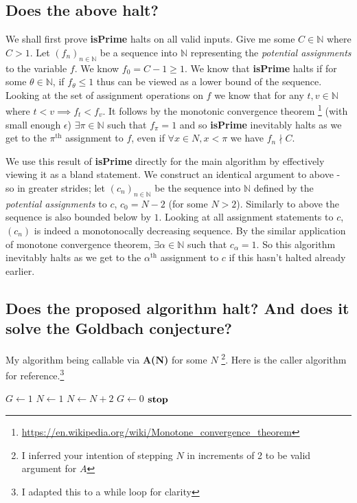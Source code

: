 \documentclass{article}
\begin{document}
\subsection{Does the above halt?}
We shall first prove \textbf{isPrime} halts on all valid inputs. Give me some $C \in \mathbb{N}$ where $C>1$. Let $(f_n)_{n\in\mathbb{N}}$ be a sequence into $\mathbb{N}$ representing the \emph{potential assignments} to the variable $f$. We know $f_0 = C - 1 \geq 1$. We know that \textbf{isPrime} halts if for some $\theta \in \mathbb{N}$, if $f_{\theta} \leq 1$ thus can be viewed as a lower bound of the sequence. Looking at the set of assignment operations on $f$ we know that for any $t,v \in \mathbb{N}$ where $t < v \implies f_t < f_v$. It follows by the monotonic convergence theorem \footnote{\url{https://en.wikipedia.org/wiki/Monotone_convergence_theorem}} (with small enough $\epsilon$) $\exists \pi \in \mathbb{N}$ such that $f_{\pi} = 1$ and so \textbf{isPrime} inevitably halts as we get to the $\pi^{\text{th}}$ assignment to $f$, even if $\forall x \in N, x< \pi$ we have $f_n \nmid C$.

We use this result of \textbf{isPrime} directly for the main algorithm by effectively viewing it as a bland statement. We construct an identical argument to above - so in greater strides; let $(c_n)_{n\in\mathbb{N}}$ be the sequence into $\mathbb{N}$ defined by the \emph{potential assignments} to $c$, $c_0 = N - 2$ (for some $N > 2$). Similarly to above the sequence is also bounded below by $1$. Looking at all assignment statements to $c$, $(c_n)$ is indeed a monotonocally decreasing sequence. By the similar application of monotone convergence theorem, $\exists \alpha \in \mathbb{N}$ such that $c_{\alpha} = 1$. So this algorithm inevitably halts as we get to the $\alpha^{\text{th}}$ assignment to $c$ if this hasn't halted already earlier.

\pagebreak
\subsection{Does the proposed algorithm halt? And does it solve the Goldbach conjecture?}
My algorithm being callable via \textbf{A(N)} for some $N$ \footnote{I inferred your intention of stepping $N$ in increments of 2 to be valid argument for $A$}. Here is the caller algorithm for reference.\footnote{I adapted this to a while loop for clarity}


\begin{algorithmic}[1]
	\STATE $G \leftarrow 1$
	\STATE $N \leftarrow 1$
			\STATE $N \leftarrow N + 2$
		\ENDWHILE
		\STATE $G \leftarrow 0$
	\STATE $\text{\textbf{stop}}$ 
\end{algorithmic}
\end{document}
